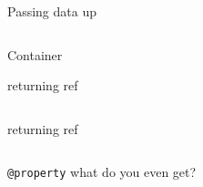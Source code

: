 \documentclass[aspectratio=169,notes]{beamer}
\begin{document}
	\begin{frame}[fragile]{Passing data up}
		\begin{columns}[T]
		\begin{column}{0.49\textwidth}
		
		\end{column}
		\pause
		\begin{column}{0.49\textwidth}
		
		\end{column}
		\end{columns}
	\end{frame}

	\begin{frame}[fragile]{Container}
		
	\end{frame}

	\begin{frame}[fragile]{returning ref}
		\begin{columns}[T]
		\begin{column}{0.49\textwidth}
		
		\end{column}
		\pause
		\begin{column}{0.49\textwidth}
		
		\end{column}
		\end{columns}
	\end{frame}

	\begin{frame}[fragile]{returning ref}
		\begin{columns}[T]
		\begin{column}{0.49\textwidth}
		
		\end{column}
		\pause
		\begin{column}{0.49\textwidth}
		
		\pause
		
		\end{column}
		\end{columns}
	\end{frame}

	\begin{frame}[fragile]{\lstinline|@property| what do you even get?}
		
	\end{frame}
\end{document}

